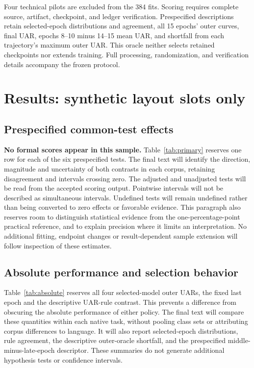 \documentclass[letterpaper]{article}
\begin{document}
Four technical pilots are excluded from the 384 fits. Scoring requires
complete source, artifact, checkpoint, and ledger verification. Prespecified
descriptions retain selected-epoch distributions and agreement, all
15 epochs' outer curves, final UAR, epochs 8--10 minus 14--15 mean UAR,
and shortfall from each trajectory's maximum outer UAR. This oracle
neither selects retained checkpoints nor extends training. Full processing,
randomization, and verification details accompany the frozen protocol.

\section{Results: synthetic layout slots only}
\subsection{Prespecified common-test effects}
\textbf{No formal scores appear in this sample.} Table~\ref{tab:primary} reserves one row for each of the six prespecified tests. The final text will identify the direction, magnitude and uncertainty of both contrasts in each corpus, retaining disagreement and intervals crossing zero. The adjusted and unadjusted tests will be read from the accepted scoring output. Pointwise intervals will not be described as simultaneous intervals. Undefined tests will remain undefined rather than being converted to zero effects or favorable evidence. This paragraph also reserves room to distinguish statistical evidence from the one-percentage-point practical reference, and to explain precision where it limits an interpretation. No additional fitting, endpoint changes or result-dependent sample extension will follow inspection of these estimates.



\subsection{Absolute performance and selection behavior}
Table~\ref{tab:absolute} reserves all four selected-model outer UARs, the fixed last epoch and the descriptive UAR-rule contrast. This prevents a difference from obscuring the absolute performance of either policy. The final text will compare these quantities within each native task, without pooling class sets or attributing corpus differences to language. It will also report selected-epoch distributions, rule agreement, the descriptive outer-oracle shortfall, and the prespecified middle-minus-late-epoch descriptor. These summaries do not generate additional hypothesis tests or confidence intervals.
\end{document}
